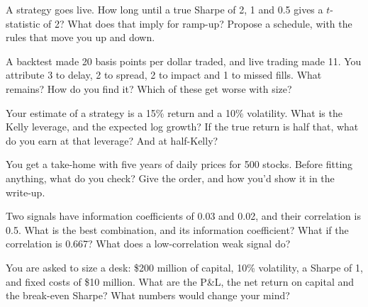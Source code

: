 \begin{question}\label{iq:iv2:research-and-strategy-cases:17}
A strategy goes live. How long until a true Sharpe of 2, 1 and 0.5 gives a $t$-statistic of 2? What does that imply for ramp-up? Propose a schedule, with the rules that move you up and down.
\end{question}

\begin{question}\label{iq:iv2:research-and-strategy-cases:18}
A backtest made 20 basis points per dollar traded, and live trading made 11. You attribute 3 to delay, 2 to spread, 2 to impact and 1 to missed fills. What remains? How do you find it? Which of these get worse with size?
\end{question}

\begin{question}\label{iq:iv2:research-and-strategy-cases:19}
Your estimate of a strategy is a 15\% return and a 10\% volatility. What is the Kelly leverage, and the expected log growth? If the true return is half that, what do you earn at that leverage? And at half-Kelly?
\end{question}

\begin{question}\label{iq:iv2:research-and-strategy-cases:20}
You get a take-home with five years of daily prices for 500 stocks. Before fitting anything, what do you check? Give the order, and how you'd show it in the write-up.
\end{question}

\begin{question}\label{iq:iv2:research-and-strategy-cases:21}
Two signals have information coefficients of 0.03 and 0.02, and their correlation is 0.5. What is the best combination, and its information coefficient? What if the correlation is 0.667? What does a low-correlation weak signal do?
\end{question}

\begin{question}\label{iq:iv2:research-and-strategy-cases:22}
You are asked to size a desk: \$200 million of capital, 10\% volatility, a Sharpe of 1, and fixed costs of \$10 million. What are the P\&L, the net return on capital and the break-even Sharpe? What numbers would change your mind?
\end{question}

